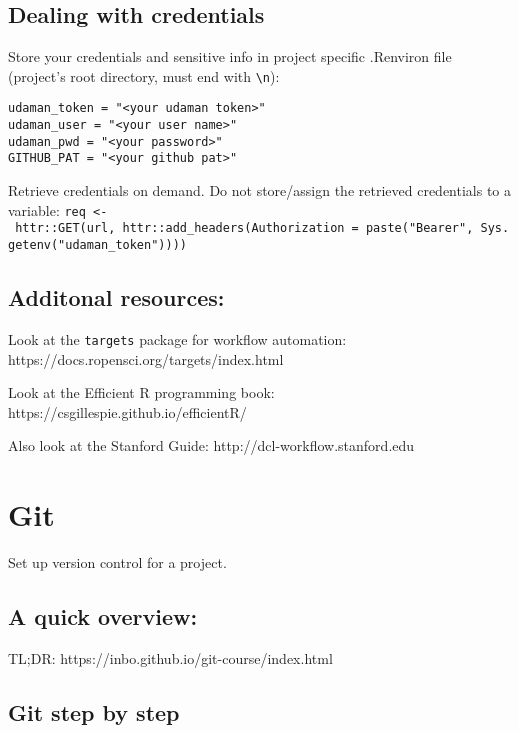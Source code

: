 \documentclass[
  letterpaper,
  DIV=11,
  numbers=noendperiod]{scrreport}
\begin{document}
\hypertarget{dealing-with-credentials}{%
\section{Dealing with credentials}\label{dealing-with-credentials}}

Store your credentials and sensitive info in project specific .Renviron
file (project's root directory, must end with
\texttt{\textbackslash{}n}):

\begin{verbatim}
udaman_token = "<your udaman token>"
udaman_user = "<your user name>"
udaman_pwd = "<your password>"
GITHUB_PAT = "<your github pat>"
\end{verbatim}

Retrieve credentials on demand. Do not store/assign the retrieved
credentials to a variable:
\texttt{req\ \textless{}-\ httr::GET(url,\ httr::add\_headers(Authorization\ =\ paste("Bearer",\ Sys.getenv("udaman\_token"))))}

\hypertarget{additonal-resources}{%
\section{Additonal resources:}\label{additonal-resources}}

Look at the \texttt{targets} package for workflow automation:
https://docs.ropensci.org/targets/index.html

Look at the Efficient R programming book:
https://csgillespie.github.io/efficientR/

Also look at the Stanford Guide: http://dcl-workflow.stanford.edu


\hypertarget{git}{%
\chapter{Git}\label{git}}

Set up version control for a project.

\hypertarget{a-quick-overview-1}{%
\section{A quick overview:}\label{a-quick-overview-1}}

TL;DR: https://inbo.github.io/git-course/index.html

\hypertarget{git-step-by-step}{%
\section{Git step by step}\label{git-step-by-step}}
\end{document}
